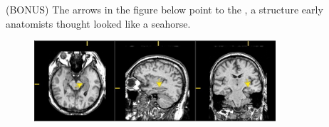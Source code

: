 \documentclass[]{exam}
\begin{document}
\begin{questions}
\question (BONUS) The arrows in the figure below point to the \fillin, a structure early anatomists thought looked like a seahorse.

\vspace{0.5in}
\begin{figure}[h]
\includegraphics[width=0.80\textwidth]{quiz-1-fig-2.jpg}
\centering
\end{figure}
\vspace{0.5in}


\end{questions}
\end{document}
